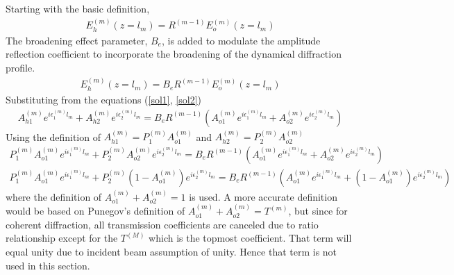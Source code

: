 Starting with the basic definition,
\begin{align}
E_h^{(m)}(z=l_m) =  R^{(m-1)} E_o^{(m)}(z=l_m)
\end{align}
The broadening effect parameter, $B_e$, is added to modulate the amplitude reflection coefficient to incorporate the broadening of the dynamical diffraction profile.
\begin{align}
E_h^{(m)}(z=l_m) = B_e R^{(m-1)} E_o^{(m)}(z=l_m)
\end{align}
Substituting from  the equations (\ref{sol1}, \ref{sol2})
\begin{align}
A_{h1}^{(m)} e^{i \epsilon_1^{(m)} l_m}+A_{h2}^{(m)} e^{i \epsilon_2^{(m)} l_m}= B_e R^{(m-1)}(A_{o1}^{(m)} e^{i \epsilon_1^{(m)} l_m}+A_{o2}^{(m)} e^{i \epsilon_2^{(m)} l_m})
\end{align}
Using the definition of $A_{h1}^{(m)}=P_1^{(m)} A_{o1}^{(m)} $ and $A_{h2}^{(m)}=P_2^{(m)} A_{o2}^{(m)} $
\begin{align}
P_1^{(m)} A_{o1}^{(m)} e^{i \epsilon_1^{(m)} l_m}+ P_2^{(m)}A_{o2}^{(m)} e^{i \epsilon_2^{(m)} l_m}=B_e R^{(m-1)}(A_{o1}^{(m)} e^{i \epsilon_1^{(m)} l_m}+A_{o2}^{(m)} e^{i \epsilon_2^{(m)} l_m})\\
P_1^{(m)} A_{o1}^{(m)} e^{i \epsilon_1^{(m)} l_m}+ P_2^{(m)}(1-A_{o1}^{(m)}) e^{i \epsilon_2^{(m)} l_m}=B_e R^{(m-1)}(A_{o1}^{(m)} e^{i \epsilon_1^{(m)} l_m}+(1-A_{o1}^{(m)}) e^{i \epsilon_2^{(m)} l_m})
\end{align}
where the definition of $A_{o1}^{(m)} + A_{o2}^{(m)}=1$ is used.  A more accurate definition would be based on Punegov's definition of $A_{o1}^{(m)} + A_{o2}^{(m)}=T^{(m)}$, but since for coherent diffraction, all transmission coefficients are canceled due to ratio relationship except for the $T^{(M)}$ which is the topmost coefficient.  That term will equal unity due to incident beam assumption of unity.  Hence that term is not used in this section.

